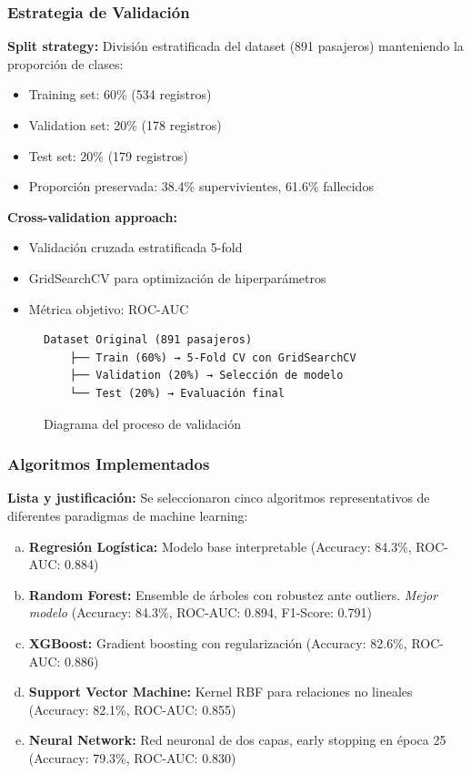 \documentclass[conference]{IEEEtran}
\begin{document}
\subsubsection{Estrategia de Validación}

\textbf{Split strategy:}
División estratificada del dataset (891 pasajeros) manteniendo la proporción de clases:
\begin{itemize}
\item Training set: 60\% (534 registros)
\item Validation set: 20\% (178 registros)
\item Test set: 20\% (179 registros)
\item Proporción preservada: 38.4\% supervivientes, 61.6\% fallecidos
\end{itemize}

\textbf{Cross-validation approach:}
\begin{itemize}
\item Validación cruzada estratificada 5-fold
\item GridSearchCV para optimización de hiperparámetros
\item Métrica objetivo: ROC-AUC
\end{itemize}

\begin{figure}[h]
\centering
\begin{verbatim}
Dataset Original (891 pasajeros)
    ├── Train (60%) → 5-Fold CV con GridSearchCV
    ├── Validation (20%) → Selección de modelo
    └── Test (20%) → Evaluación final
\end{verbatim}
\caption{Diagrama del proceso de validación}
\label{fig:validation_process}
\end{figure}

\subsubsection{Algoritmos Implementados}

\textbf{Lista y justificación:}
Se seleccionaron cinco algoritmos representativos de diferentes paradigmas de machine learning:

\begin{enumerate}[a)]
\item \textbf{Regresión Logística:} Modelo base interpretable (Accuracy: 84.3\%, ROC-AUC: 0.884)
\item \textbf{Random Forest:} Ensemble de árboles con robustez ante outliers. \textit{Mejor modelo} (Accuracy: 84.3\%, ROC-AUC: 0.894, F1-Score: 0.791)
\item \textbf{XGBoost:} Gradient boosting con regularización (Accuracy: 82.6\%, ROC-AUC: 0.886)
\item \textbf{Support Vector Machine:} Kernel RBF para relaciones no lineales (Accuracy: 82.1\%, ROC-AUC: 0.855)
\item \textbf{Neural Network:} Red neuronal de dos capas, early stopping en época 25 (Accuracy: 79.3\%, ROC-AUC: 0.830)
\end{enumerate}
\end{document}
